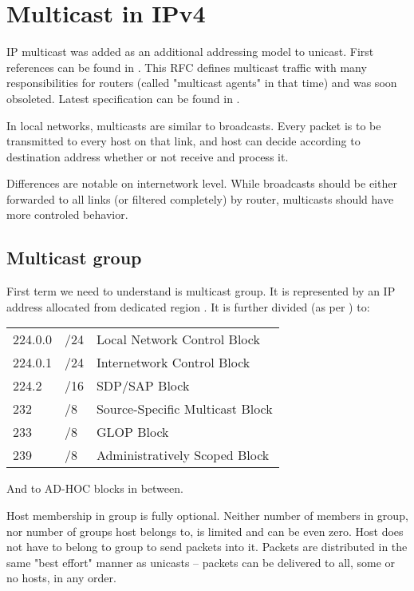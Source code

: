 \chapter{Multicast in IPv4}

IP multicast was added as an additional addressing model to unicast. First
references can be found in . This RFC defines multicast traffic
with many responsibilities for routers (called "multicast agents" in that time)
and was soon obsoleted. Latest specification can be found in .

In local networks, multicasts are similar to broadcasts. Every packet is to be
transmitted to every host on that link, and host can decide according to
destination address whether or not receive and process it.

Differences are notable on internetwork level. While broadcasts should be
either forwarded to all links (or filtered completely) by router, multicasts
should have more controled behavior.

\section{Multicast group}

First term we need to understand is multicast group. It is represented by an IP
address allocated from dedicated region . It is further
divided (as per ) to:

\begin{tabular}{lll}
	224.0.0&/24	& Local Network Control Block \\
	224.0.1&/24	& Internetwork Control Block \\
	224.2&/16	& SDP/SAP Block \\
	232&/8		& Source-Specific Multicast Block \\
	233&/8		& GLOP Block \\
	239&/8		& Administratively Scoped Block \\
\end{tabular}

And to AD-HOC blocks in between.

Host membership in group is fully optional. Neither number of members in group,
nor number of groups host belongs to, is limited and can be even zero. Host
does not have to belong to group to send packets into it. Packets are
distributed in the same "best effort" manner as unicasts -- packets can be
delivered to all, some or no hosts, in any order.

